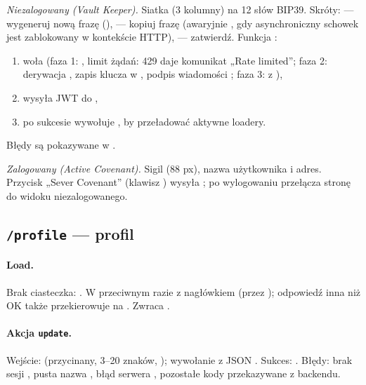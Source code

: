 \emph{Niezalogowany (Vault Keeper).} Siatka  (3 kolumny) na 12 słów BIP39.
Skróty:  --- wygeneruj nową frazę (),  --- kopiuj frazę
(awaryjnie , gdy asynchroniczny schowek jest zablokowany
w kontekście HTTP),  --- zatwierdź. Funkcja :
\begin{enumerate}[nosep]
  \item woła  (faza 1: ,
        limit żądań: 429 daje komunikat „Rate limited”; faza 2: derywacja ,
        zapis klucza w , podpis wiadomości
        ; faza 3: 
        z ),
  \item wysyła JWT do ,
  \item po sukcesie wywołuje , by przeładować aktywne loadery.
\end{enumerate}
Błędy są pokazywane w .

\emph{Zalogowany (Active Covenant).} Sigil (88 px), nazwa użytkownika i adres. Przycisk
„Sever Covenant” (klawisz ) wysyła ; po wylogowaniu 
przełącza stronę do widoku niezalogowanego.

\subsection{\texttt{/profile} --- profil}

\paragraph{Load.} Brak ciasteczka: . W przeciwnym razie
 z nagłówkiem  (przez
); odpowiedź inna niż OK także przekierowuje na . Zwraca
.

\paragraph{Akcja \texttt{update}.} Wejście:  (przycinany, 3--20 znaków,
\code{[a-zA-Z0-9_-]}); wywołanie  z JSON .
Sukces: . Błędy: brak sesji ,
pusta nazwa , błąd serwera ,
pozostałe kody przekazywane z backendu.

